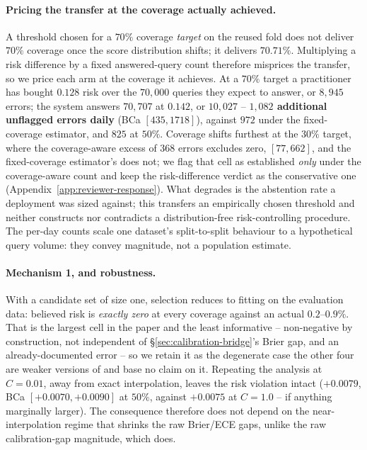 \documentclass{article}
\begin{document}
\paragraph{Pricing the transfer at the coverage actually achieved.} A threshold
chosen for a $70\%$ coverage \emph{target} on the reused fold does not deliver
$70\%$ coverage once the score distribution shifts; it delivers $70.71\%$.
Multiplying a risk difference by a fixed answered-query count therefore
misprices the transfer, so we price each arm at the coverage it achieves. At a
$70\%$ target a practitioner has bought $0.128$ risk over the $70{,}000$
queries they expect to answer, or $8{,}945$ errors; the system answers
$70{,}707$ at $0.142$, or $10{,}027$ -- \textbf{$1{,}082$ additional unflagged
errors daily} (BCa $[435,1718]$), against $972$ under the fixed-coverage
estimator, and $825$ at $50\%$. Coverage shifts furthest at the $30\%$ target,
where the coverage-aware excess of $368$ errors excludes zero, $[77,662]$,
and the fixed-coverage estimator's does not; we flag that cell as established
\emph{only} under the coverage-aware count and keep the risk-difference
verdict as the conservative one (Appendix~\ref{app:reviewer-response}). What
degrades is the abstention rate a deployment was sized against; this transfers
an empirically chosen threshold and neither constructs nor contradicts a
distribution-free risk-controlling procedure. The per-day counts scale one
dataset's split-to-split behaviour to a hypothetical query volume: they convey
magnitude, not a population estimate.

\paragraph{Mechanism 1, and robustness.} With a candidate set of size one,
selection reduces to fitting on the evaluation data: believed risk is
\emph{exactly zero} at every coverage against an actual $0.2$--$0.9\%$. That is
the largest cell in the paper and the least informative -- non-negative by
construction, not independent of \S\ref{sec:calibration-bridge}'s Brier gap,
and an already-documented error -- so we retain it as the degenerate case the
other four are weaker versions of and base no claim on it. Repeating the
analysis at $C=0.01$, away from exact interpolation, leaves the risk violation
intact ($+0.0079$, BCa $[+0.0070,+0.0090]$ at $50\%$, against $+0.0075$ at
$C=1.0$ -- if anything marginally larger). The consequence therefore does not
depend on the near-interpolation regime that shrinks the raw Brier/ECE gaps,
unlike the raw calibration-gap magnitude, which does.
\end{document}
